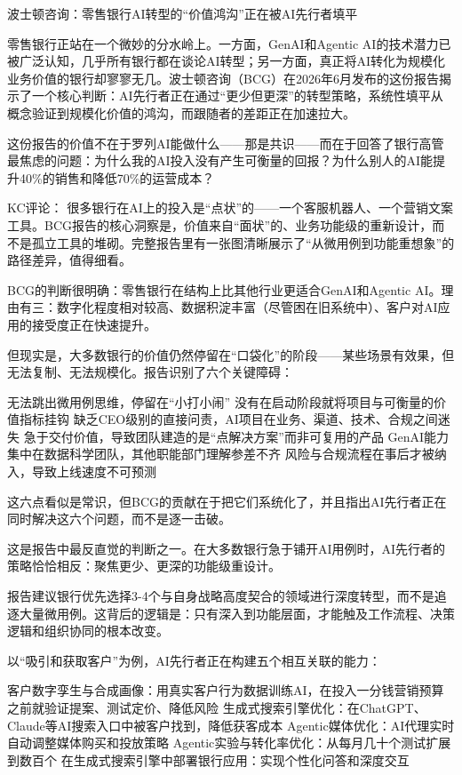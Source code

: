 \documentclass[11pt]{ctexart}
\begin{document}
波士顿咨询：零售银行AI转型的“价值鸿沟”正在被AI先行者填平

零售银行正站在一个微妙的分水岭上。一方面，GenAI和Agentic AI的技术潜力已被广泛认知，几乎所有银行都在谈论AI转型；另一方面，真正将AI转化为规模化业务价值的银行却寥寥无几。波士顿咨询（BCG）在2026年6月发布的这份报告揭示了一个核心判断：AI先行者正在通过“更少但更深”的转型策略，系统性填平从概念验证到规模化价值的鸿沟，而跟随者的差距正在加速拉大。

这份报告的价值不在于罗列AI能做什么——那是共识——而在于回答了银行高管最焦虑的问题：为什么我的AI投入没有产生可衡量的回报？为什么别人的AI能提升40\%的销售和降低70\%的运营成本？

KC评论： 很多银行在AI上的投入是“点状”的——一个客服机器人、一个营销文案工具。BCG报告的核心洞察是，价值来自“面状”的、业务功能级的重新设计，而不是孤立工具的堆砌。完整报告里有一张图清晰展示了“从微用例到功能重想象”的路径差异，值得细看。

BCG的判断很明确：零售银行在结构上比其他行业更适合GenAI和Agentic AI。理由有三：数字化程度相对较高、数据积淀丰富（尽管困在旧系统中）、客户对AI应用的接受度正在快速提升。

但现实是，大多数银行的价值仍然停留在“口袋化”的阶段——某些场景有效果，但无法复制、无法规模化。报告识别了六个关键障碍：

无法跳出微用例思维，停留在“小打小闹” 没有在启动阶段就将项目与可衡量的价值指标挂钩 缺乏CEO级别的直接问责，AI项目在业务、渠道、技术、合规之间迷失 急于交付价值，导致团队建造的是“点解决方案”而非可复用的产品 GenAI能力集中在数据科学团队，其他职能部门理解参差不齐 风险与合规流程在事后才被纳入，导致上线速度不可预测

这六点看似是常识，但BCG的贡献在于把它们系统化了，并且指出AI先行者正在同时解决这六个问题，而不是逐一击破。

这是报告中最反直觉的判断之一。在大多数银行急于铺开AI用例时，AI先行者的策略恰恰相反：聚焦更少、更深的功能级重设计。

报告建议银行优先选择3-4个与自身战略高度契合的领域进行深度转型，而不是追逐大量微用例。这背后的逻辑是：只有深入到功能层面，才能触及工作流程、决策逻辑和组织协同的根本改变。

以“吸引和获取客户”为例，AI先行者正在构建五个相互关联的能力：

客户数字孪生与合成画像：用真实客户行为数据训练AI，在投入一分钱营销预算之前就验证提案、测试定价、降低风险 生成式搜索引擎优化：在ChatGPT、Claude等AI搜索入口中被客户找到，降低获客成本 Agentic媒体优化：AI代理实时自动调整媒体购买和投放策略 Agentic实验与转化率优化：从每月几十个测试扩展到数百个 在生成式搜索引擎中部署银行应用：实现个性化问答和深度交互
\end{document}
